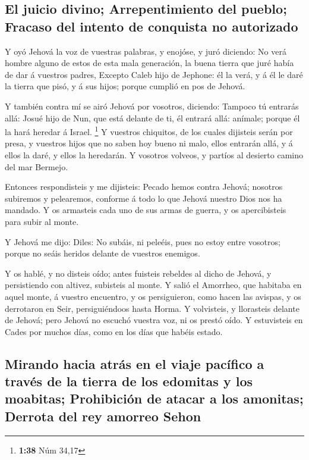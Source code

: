 \hypertarget{el-juicio-divino-arrepentimiento-del-pueblo-fracaso-del-intento-de-conquista-no-autorizado}{%
\subsection{El juicio divino; Arrepentimiento del pueblo; Fracaso del
intento de conquista no
autorizado}\label{el-juicio-divino-arrepentimiento-del-pueblo-fracaso-del-intento-de-conquista-no-autorizado}}

 Y oyó Jehová la voz de vuestras palabras, y enojóse, y
juró diciendo:  No verá hombre alguno de estos de esta
mala generación, la buena tierra que juré había de dar á vuestros
padres,  Excepto Caleb hijo de Jephone: él la verá, y á
él le daré la tierra que pisó, y á sus hijos; porque cumplió en pos de
Jehová.

 Y también contra mí se airó Jehová por vosotros,
diciendo: Tampoco tú entrarás allá:  Josué hijo de Nun,
que está delante de ti, él entrará allá: anímale; porque él la hará
heredar á Israel. \footnote{\textbf{1:38} Núm 34,17}  Y
vuestros chiquitos, de los cuales dijisteis serán por presa, y vuestros
hijos que no saben hoy bueno ni malo, ellos entrarán allá, y á ellos la
daré, y ellos la heredarán.  Y vosotros volveos, y
partíos al desierto camino del mar Bermejo.

 Entonces respondisteis y me dijisteis: Pecado hemos
contra Jehová; nosotros subiremos y pelearemos, conforme á todo lo que
Jehová nuestro Dios nos ha mandado. Y os armasteis cada uno de sus armas
de guerra, y os apercibisteis para subir al monte.

 Y Jehová me dijo: Diles: No subáis, ni peleéis, pues no
estoy entre vosotros; porque no seáis heridos delante de vuestros
enemigos.

 Y os hablé, y no disteis oído; antes fuisteis rebeldes
al dicho de Jehová, y persistiendo con altivez, subisteis al monte.
 Y salió el Amorrheo, que habitaba en aquel monte, á
vuestro encuentro, y os persiguieron, como hacen las avispas, y os
derrotaron en Seir, persiguiéndoos hasta Horma.  Y
volvisteis, y llorasteis delante de Jehová; pero Jehová no escuchó
vuestra voz, ni os prestó oído.  Y estuvisteis en Cades
por muchos días, como en los días que habéis estado.

\hypertarget{mirando-hacia-atruxe1s-en-el-viaje-pacuxedfico-a-travuxe9s-de-la-tierra-de-los-edomitas-y-los-moabitas-prohibiciuxf3n-de-atacar-a-los-amonitas-derrota-del-rey-amorreo-sehon}{%
\subsection{Mirando hacia atrás en el viaje pacífico a través de la
tierra de los edomitas y los moabitas; Prohibición de atacar a los
amonitas; Derrota del rey amorreo
Sehon}\label{mirando-hacia-atruxe1s-en-el-viaje-pacuxedfico-a-travuxe9s-de-la-tierra-de-los-edomitas-y-los-moabitas-prohibiciuxf3n-de-atacar-a-los-amonitas-derrota-del-rey-amorreo-sehon}}

